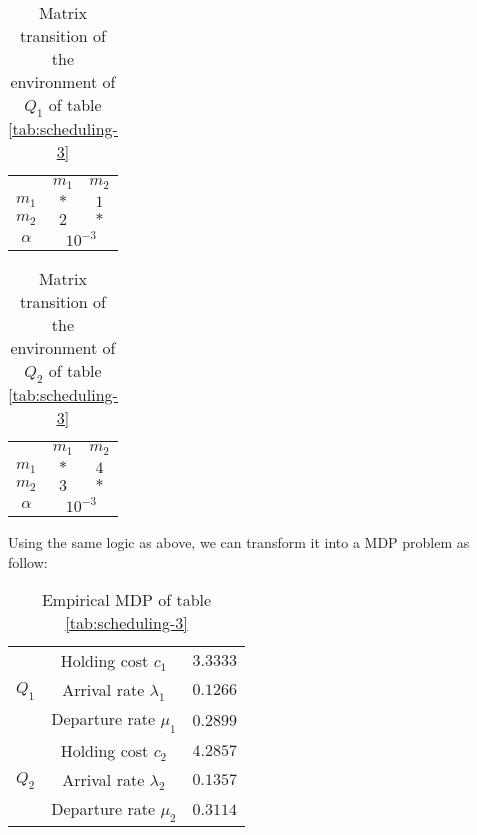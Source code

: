 \documentclass[
  a4paper, xcolor = usenames,dvipsnames]{article}
\theoremstyle{definition}
\theoremstyle{definition}
\theoremstyle{definition}
\theoremstyle{definition}
\theoremstyle{remark}
\begin{document}
\begin{table}[!htbp]
\caption{Matrix transition of the environment of $Q_{1}$ of table \ref{tab:scheduling-3}}
\begin{center}
\begin{tabular}{c c c}
    \hline
    & $m_{1}$ & $m_{2}$ \\
    $m_{1}$ & $*$ & $1$ \\
    $m_{2}$ & $2$ & $*$ \\
    \hline
    $\alpha$ & \multicolumn{2}{c}{$10^{-3}$} \\
    \hline
\end{tabular}
\end{center}
\label{tab:scheduling-3-mat-1}
\end{table}

\begin{table}[!htbp]
\caption{Matrix transition of the environment of $Q_{2}$ of table \ref{tab:scheduling-3}}
\begin{center}
\begin{tabular}{c c c}
    \hline
    & $m_{1}$ & $m_{2}$ \\
    $m_{1}$ & $*$ & $4$ \\
    $m_{2}$ & $3$ & $*$ \\
    \hline
    $\alpha$ & \multicolumn{2}{c}{$10^{-3}$} \\
    \hline
\end{tabular}
\end{center}
\label{tab:scheduling-3-mat-2}
\end{table}

Using the same logic as above, we can transform it into a MDP problem as follow:

\begin{table}[!htbp]
\caption{Empirical MDP of table \ref{tab:scheduling-3}}
\begin{center}
\begin{tabular}{c c c}
    \hline
    \multirow{3}{*}{$Q_{1}$} & Holding cost $c_{1}$ & $3.3333$ \\
    & Arrival rate $\lambda_{1}$ & $0.1266$ \\
    & Departure rate $\mu_{1}$ & $0.2899$ \\
    \cline{2-3}
    \multirow{3}{*}{$Q_{2}$} & Holding cost $c_{2}$ & $4.2857$ \\
    & Arrival rate $\lambda_{2}$ & $0.1357$ \\
    & Departure rate $\mu_{2}$ & $0.3114$ \\    
    \hline
\end{tabular}
\end{center}
\label{tab:mdp-scheduling-3}
\end{table}
\end{document}
